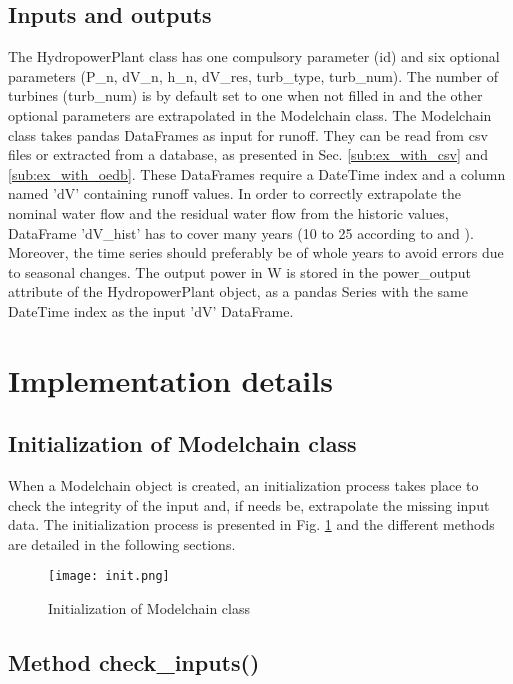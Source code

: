 \subsection{Inputs and outputs}

The HydropowerPlant class has one compulsory parameter (id) and six optional parameters (P{\_}n, dV{\_}n, h{\_}n, dV{\_}res, turb{\_}type, turb{\_}num). The number of turbines (turb{\_}num) is by default set to one when not filled in and the other optional parameters are extrapolated in the Modelchain class. \newline 
The Modelchain class takes pandas DataFrames as input for runoff. They can be read from csv files or extracted from a database, as presented in Sec. \ref{sub:ex_with_csv} and \ref{sub:ex_with_oedb}. These DataFrames require a DateTime index and a column named 'dV' containing runoff values. In order to correctly extrapolate the nominal water flow and the residual water flow from the historic values, DataFrame 'dV{\_}hist' has to cover many years (10 to 25 according to \cite{pacer} and \cite{cetmef}). Moreover, the time series should preferably be of whole years to avoid errors due to seasonal changes. \newline
The output power in \unit{W} is stored in the power{\_}output attribute of the HydropowerPlant object, as a pandas Series with the same DateTime index as the input 'dV' DataFrame.

\section{Implementation details}

\subsection{Initialization of Modelchain class}

When a Modelchain object is created, an initialization process takes place to check the integrity of the input and, if needs be, extrapolate the missing input data. The initialization process is presented in Fig. \ref{init} and the different methods are detailed in the following sections.

\begin{figure}[H]
\centering
\texttt{[image: init.png]}
\caption{Initialization of Modelchain class}
\label{init}
\end{figure}

\subsection{Method check{\_}inputs()}
\label{sub:check_feas}

